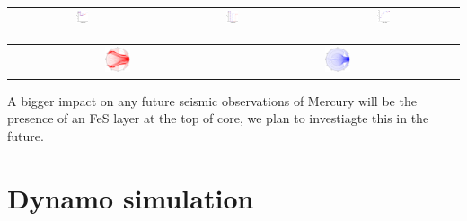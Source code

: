 \documentclass[landscape,a0b,final]{a0poster}
\begin{document}
\begin{multicols}{3}
\begin{center}
\begin{tabular}{ccc}
 \includegraphics[width=0.09\textwidth]{merc_both_models_1} &
 \includegraphics[width=0.09\textwidth]{merc_both_models_2} &
 \includegraphics[width=0.09\textwidth]{merc_both_models_3} 
\end{tabular}
\end{center}

\columnbreak

\begin{center}
\begin{tabular}{ccc}
 \includegraphics[width=0.12\textwidth]{smapath.png} &
 \includegraphics[width=0.12\textwidth]{bigpath.png} &
\end{tabular}
\end{center}

A bigger impact on any future seismic observations of Mercury will be the presence of an FeS layer at the top of core, we plan to investiagte this in the future.



\section*{Dynamo simulation}


\end{multicols}
\end{document}
